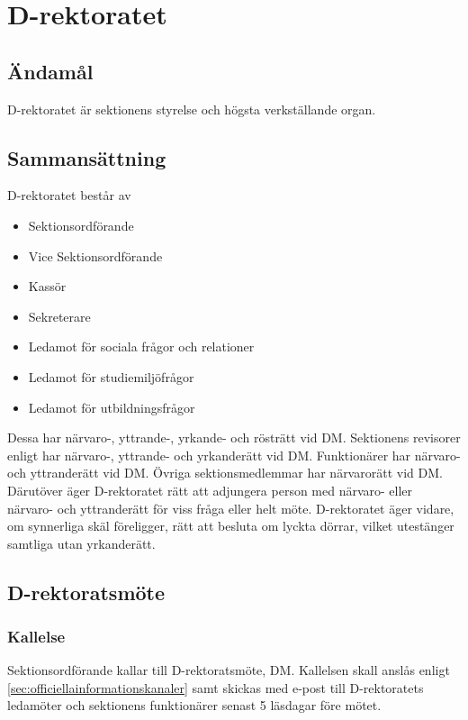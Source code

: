 \documentclass[a4paper,12pt]{article}
\begin{document}
\section{D-rektoratet}

\subsection{Ändamål}

D-rektoratet är sektionens styrelse och högsta verkställande organ.

\subsection{Sammansättning}

D-rektoratet består av

\begin{itemize}
  \item Sektionsordförande
  \item Vice Sektionsordförande
  \item Kassör
  \item Sekreterare
  \item Ledamot för sociala frågor och relationer
  \item Ledamot för studiemiljöfrågor
  \item Ledamot för utbildningsfrågor
\end{itemize}

Dessa har närvaro-, yttrande-, yrkande- och rösträtt vid DM. Sektionens revisorer enligt har närvaro-, yttrande- och yrkanderätt vid DM. Funktionärer har närvaro- och yttranderätt vid DM. Övriga sektionsmedlemmar har närvarorätt vid DM. Därutöver äger D-rektoratet rätt att adjungera person med närvaro- eller närvaro- och yttranderätt för viss fråga eller helt möte. D-rektoratet äger vidare, om synnerliga skäl föreligger, rätt att besluta om lyckta dörrar, vilket utestänger samtliga utan yrkanderätt.

\subsection{D-rektoratsmöte}
\label{sec:d-rektoratsmote}

\subsubsection{Kallelse}

Sektionsordförande kallar till D-rektoratsmöte, DM. Kallelsen skall anslås enligt \ref{sec:officiellainformationskanaler} samt skickas med e-post till D-rektoratets ledamöter och sektionens funktionärer senast 5 läsdagar före mötet.
\end{document}
